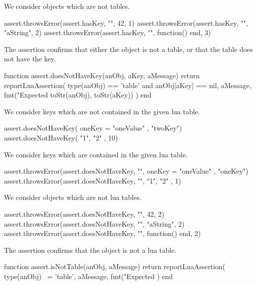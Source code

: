 
We consider objects which are not tables.

\startLuaTest
  assert.throwsError(assert.hasKey, "", 42, 1)
  assert.throwsError(assert.hasKey, "", "aString", 2)
  assert.throwsError(assert.hasKey, "", function() end, 3)
\stopLuaTest
\stopTestCase

\stopTestSuite


The  assertion confirms that either the object 
is not a table, or that the table does not have the key. 

\startLuaCode
function assert.doesNotHaveKey(anObj, aKey, aMessage)
  return reportLuaAssertion(
    type(anObj) == 'table' and anObj[aKey] == nil,
    aMessage,
    fmt("Expected %
      toStr(anObj), toStr(aKey))
  )
end
\stopLuaCode


We consider keys which are not contained in the given lua table.

\startLuaTest
  assert.doesNotHaveKey({ oneKey = "oneValue" }, "twoKey")
  assert.doesNotHaveKey({ "1", "2" }, 10)
\stopLuaTest
\stopTestCase


We consider keys which are contained in the given lua table.

\startLuaTest
  assert.throwsError(assert.doesNotHaveKey, "",
    { oneKey = "oneValue" }, "oneKey")
  assert.throwsError(assert.doesNotHaveKey, "",
    { "1", "2" }, 1)
\stopLuaTest
\stopTestCase


We consider objects which are not lua tables.

\startLuaTest
  assert.throwsError(assert.doesNotHaveKey, "", 42, 2)
  assert.throwsError(assert.doesNotHaveKey, "", "aString", 2)
  assert.throwsError(assert.doesNotHaveKey, "",
    function() end, 2)
\stopLuaTest
\stopTestCase

\stopTestSuite


The  assertion confirms that the object is not a 
lua table. 

\startLuaCode
function assert.isNotTable(anObj, aMessage)
  return reportLuaAssertion(
    type(anObj) ~= 'table',
    aMessage,
    fmt("Expected %
  )
end
\stopLuaCode

